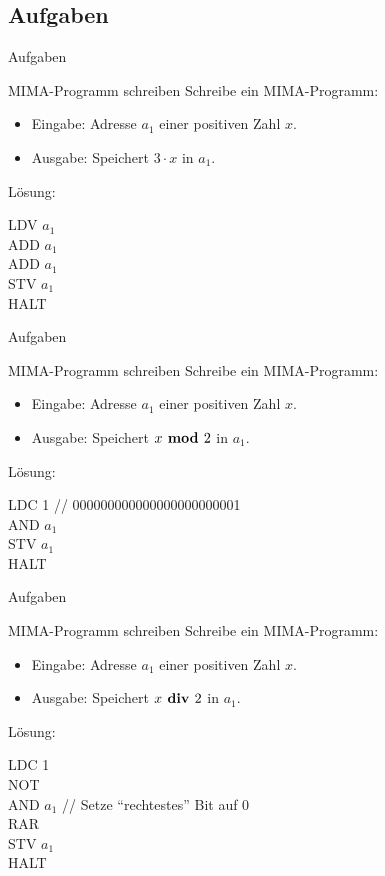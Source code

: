 \documentclass[handout]{beamer}
\begin{document}
\subsection{Aufgaben}

\begin{frame}{Aufgaben}
	\begin{taskblock}{MIMA-Programm schreiben}
		Schreibe ein MIMA-Programm:
		\begin{itemize}
			\item Eingabe: Adresse $a_1$ einer positiven Zahl $x$.
			\item Ausgabe: Speichert $3 \cdot x$ in $a_1$.
		\end{itemize}
	\end{taskblock}
	
	\bp \vspace{.5cm} Lösung:
	
	LDV $a_1$ \\ ADD $a_1$ \\ ADD $a_1$ \\ STV $a_1$ \\ HALT
\end{frame}

\begin{frame}{Aufgaben}
	\begin{taskblock}{MIMA-Programm schreiben}
		Schreibe ein MIMA-Programm:
		\begin{itemize}
			\item Eingabe: Adresse $a_1$ einer positiven Zahl $x$.
			\item Ausgabe: Speichert $x \textbf{ mod } 2$ in $a_1$.
		\end{itemize}
	\end{taskblock}

	\bp \vspace{.5cm} Lösung:
	
	LDC 1 \quad // 000000000000000000000001 \\ AND $a_1$ \\ STV $a_1$ \\ HALT
\end{frame}

\begin{frame}{Aufgaben}
	\begin{taskblock}{MIMA-Programm schreiben}
		Schreibe ein MIMA-Programm:
		\begin{itemize}
			\item Eingabe: Adresse $a_1$ einer positiven Zahl $x$.
			\item Ausgabe: Speichert $x \textbf{ div } 2$ in $a_1$.
		\end{itemize}
	\end{taskblock}
	
	\bp \vspace{.5cm} Lösung:
	
	LDC 1 \\ NOT \\ AND $a_1$ \quad // Setze ``rechtestes'' Bit auf 0 \\ RAR \\ STV $a_1$ \\ HALT
\end{frame}


\end{document}
